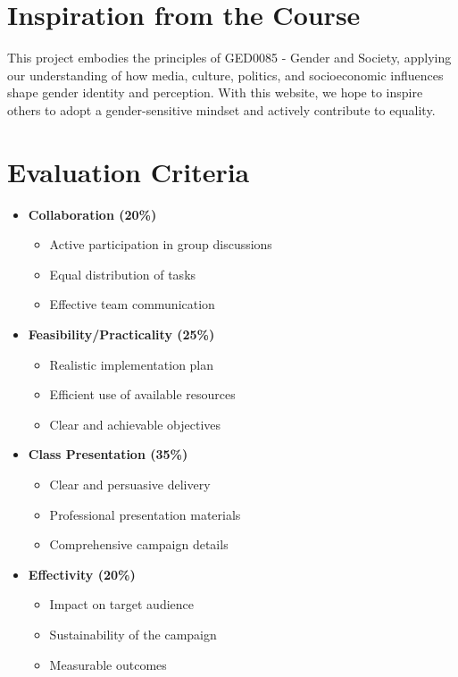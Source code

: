 \documentclass{article}
\begin{document}
\section*{Inspiration from the Course}
This project embodies the principles of GED0085 - Gender and Society, applying our understanding of how media, culture, politics, and socioeconomic influences shape gender identity and perception. With this website, we hope to inspire others to adopt a gender-sensitive mindset and actively contribute to equality.

\section*{Evaluation Criteria}
\begin{feubox}
\begin{itemize}[leftmargin=*]
    \item \textbf{Collaboration (20\%)}
    \begin{itemize}
        \item Active participation in group discussions
        \item Equal distribution of tasks
        \item Effective team communication
    \end{itemize}
    
    \item \textbf{Feasibility/Practicality (25\%)}
    \begin{itemize}
        \item Realistic implementation plan
        \item Efficient use of available resources
        \item Clear and achievable objectives
    \end{itemize}
    
    \item \textbf{Class Presentation (35\%)}
    \begin{itemize}
        \item Clear and persuasive delivery
        \item Professional presentation materials
        \item Comprehensive campaign details
    \end{itemize}
    
    \item \textbf{Effectivity (20\%)}
    \begin{itemize}
        \item Impact on target audience
        \item Sustainability of the campaign
        \item Measurable outcomes
    \end{itemize}
\end{itemize}
\end{feubox}
\end{document}
